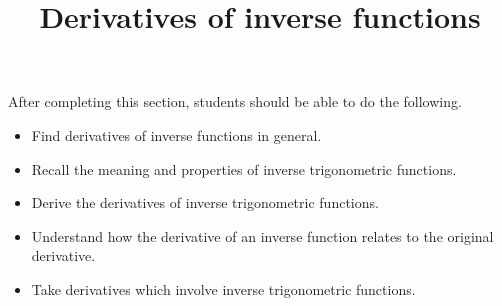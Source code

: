 \documentclass{ximera}
\title{Derivatives of inverse functions}
\begin{document}
\begin{abstract}
\end{abstract}

\maketitle

\begin{sectionOutcomes}

After completing this section, students should be able to do the following.

\begin{itemize}
	\item Find derivatives of inverse functions in general.
	\item Recall the meaning and properties of inverse trigonometric functions.
	\item Derive the derivatives of inverse trigonometric functions.
	\item Understand how the derivative of an inverse function relates to the original derivative.
	\item Take derivatives which involve inverse trigonometric functions.
\end{itemize}

\end{sectionOutcomes}
\end{document}
